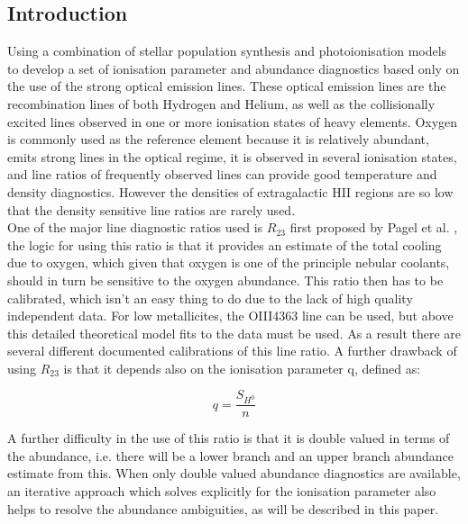 \documentclass{literature}
\begin{document}
\subsection{Introduction}
Using a combination of stellar population synthesis and photoionisation models to develop a set of ionisation parameter and abundance diagnostics based only on the use of the strong optical emission lines. These optical emission lines are the recombination lines of both Hydrogen and Helium, as well as the collisionally excited lines observed in one or more ionisation states of heavy elements. Oxygen is commonly used as the reference element because it is relatively abundant, emits strong lines in the optical regime, it is observed in several ionisation states, and line ratios of frequently observed lines can provide good temperature and density diagnostics. However the densities of extragalactic HII regions are so low that the density sensitive line ratios are rarely used.  \\ 
One of the major line diagnostic ratios used is $R_{23}$ first proposed by Pagel et al. \citep{Pagel1979}, the logic for using this ratio is that it provides an estimate of the total cooling due to oxygen, which given that oxygen is one of the principle nebular coolants, should in turn be sensitive to the oxygen abundance. This ratio then has to be calibrated, which isn't an easy thing to do due to the lack of high quality independent data. For low metallicites, the OIII4363 line can be used, but above this detailed theoretical model fits to the data must be used. As a result there are several different documented calibrations of this line ratio. A further drawback of using $R_{23}$ is that it depends also on the ionisation parameter q, defined as: 

\begin{equation}
	q = \frac{S_{H^{0}}}{n}
\end{equation}

A further difficulty in the use of this ratio is that it is double valued in terms of the abundance, i.e. there will be a lower branch and an upper branch abundance estimate from this. When only double valued abundance diagnostics are available, an iterative approach which solves explicitly for the ionisation parameter also helps to resolve the abundance ambiguities, as will be described in this paper. \\
\end{document}
